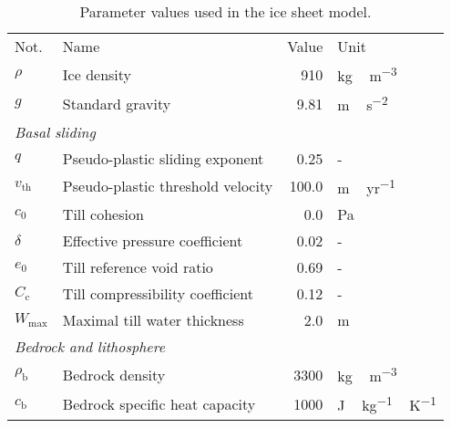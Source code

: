\documentclass[tc, manuscript]{copernicus}
\begin{document}


\newpage

\begin{table*}
  \centering
  \caption{Parameter values used in the ice sheet model.}
  \label{tab:params}
  {\begin{tabular}{llrl}
    \tophline
    Not.    & Name & Value & Unit \\
    \middlehline

    $\rho$  & Ice density
            & 910
            & \unit{kg\,m^{-3}} \\

    $g$     & Standard gravity
            & 9.81
            & \unit{m\,s^{-2}} \\

    \multicolumn{2}{l}{\emph{Basal sliding}} \\

    $q$     & Pseudo-plastic sliding exponent
            & 0.25
            & - \\

    $v_{\text{th}}$& Pseudo-plastic threshold velocity
            & 100.0
            & \unit{m\,yr^{-1}} \\

    $c_0$   & Till cohesion
            & 0.0
            & Pa \\

    $\delta$& Effective pressure coefficient
            & 0.02
            & - \\

    $e_0$   & Till reference void ratio
            & 0.69
            & - \\

    $C_{\mathrm{c}}$   & Till compressibility coefficient
            & 0.12
            & - \\

    $W_{\text{max}}$ & Maximal till water thickness
            & 2.0
            & m \\

    \multicolumn{2}{l}{\emph{Bedrock and lithosphere}} \\

    $\rho_{\mathrm{b}}$& Bedrock density
            & 3300
            & \unit{kg\,m^{-3}} \\

    $c_{\mathrm{b}}$   & Bedrock specific heat capacity
            & 1000
            & \unit{J\,kg^{-1}\,K^{-1}} \\


\end{tabular}}
\end{table*}
\end{document}
